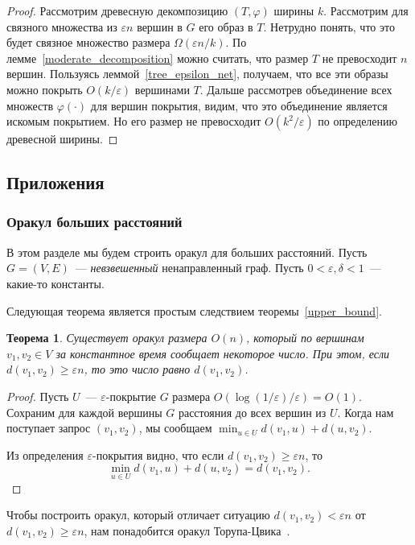 \documentclass[12pt]{article}
\newcommand{\eps}{\varepsilon}
\newtheorem{theorem}{Теорема}
\begin{document}
\begin{proof}
        Рассмотрим древесную декомпозицию $(T, \varphi)$ ширины $k$. Рассмотрим для связного множества из $\eps n$
        вершин в $G$ его образ в $T$.
        Нетрудно понять, что это будет связное множество размера $\Omega(\eps n / k)$.
        По лемме~\ref{moderate_decomposition} можно считать, что размер $T$ не превосходит $n$ вершин. Пользуясь
        леммой~\ref{tree_epsilon_net}, получаем, что все эти образы можно покрыть $O(k / \eps)$ вершинами $T$.
        Дальше рассмотрев объединение всех множеств $\varphi(\cdot)$ для вершин покрытия, видим, что это объединение является
        искомым покрытием. Но его размер не превосходит $O(k^2 / \eps)$ по определению древесной ширины.
    \end{proof}
    \subsection{Приложения}
    \label{subsection_applications}
    \subsubsection{Оракул больших расстояний}
    \label{subsubsection_distance_oracle}
    В этом разделе мы будем строить оракул для больших расстояний.
    Пусть $G = (V, E)$~--- \emph{невзвешенный} ненаправленный граф.
    Пусть $0 < \eps, \delta < 1$~--- какие-то константы.

    Следующая теорема является простым следствием теоремы~\ref{upper_bound}.

    \begin{theorem}
        \label{naive_oracle}
        Существует оракул размера $O(n)$, который по вершинам $v_1, v_2 \in V$ за константное время сообщает некоторое
        число. При этом, если $d(v_1, v_2) \geq \eps n$, то это число равно $d(v_1, v_2)$.
    \end{theorem}
    \begin{proof}
        Пусть $U$~--- $\eps$-покрытие $G$ размера $O(\log(1 / \eps) / \eps) = O(1)$.
        Сохраним для каждой вершины $G$ расстояния до всех вершин из $U$.
        Когда нам поступает запрос $(v_1, v_2)$, мы сообщаем $\min_{u \in U} d(v_1, u) + d(u, v_2)$.

        Из определения $\eps$-покрытия видно, что если $d(v_1, v_2) \geq \eps n$, то 
        $$
            \min_{u \in U} d(v_1, u) + d(u, v_2) = d(v_1, v_2).
        $$
    \end{proof}

    Чтобы построить оракул, который отличает ситуацию $d(v_1, v_2) < \eps n$ от $d(v_1, v_2) \geq \eps n$,
    нам понадобится оракул Торупа-Цвика~\cite{TZ05}.
\end{document}

